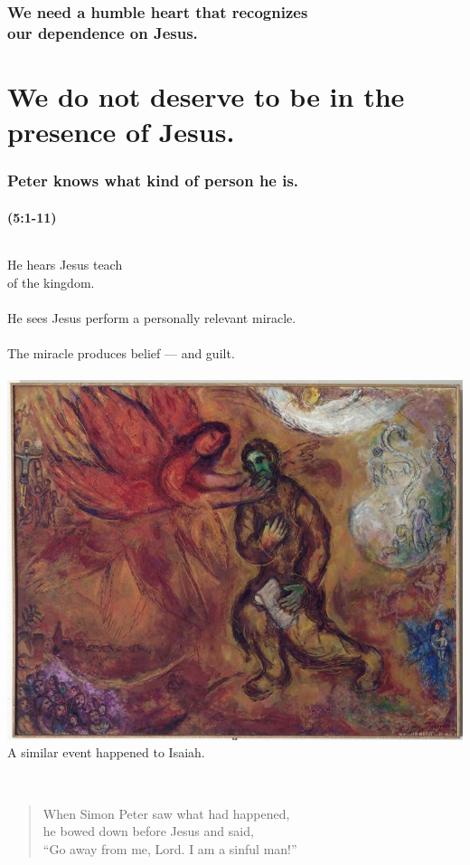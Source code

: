 \documentclass{beamer}
\begin{document}
\begin{frame}
\frametitle{We need a humble heart that recognizes\\our dependence on Jesus.}
\end{frame}

\begin{frame}
\frametitle{\insertlecture}
\tableofcontents[sectionstyle=show/show]
\end{frame}

\section{We do not deserve to be in the presence of Jesus.}
\begin{frame}
\frametitle{Peter knows what kind of person he is.}
\framesubtitle{(5:1-11)}

\begin{columns}
\column{4.5cm}
He hears Jesus teach\\of the kingdom.\\~\\
He sees Jesus perform a personally relevant miracle.\\~\\
The miracle produces belief --- and guilt.\\~\\
\column{6cm}
\includegraphics[width=\textwidth]{graphics/prophet-isaiah-1968.jpg}\\
\tiny{A similar event happened to Isaiah.}\\~\\
\end{columns}
\begin{quote}
When Simon Peter saw what had happened,\\he bowed down before Jesus and said,\\``Go away from me, Lord. I am a sinful man!''

\end{quote}
\end{frame}
\end{document}

